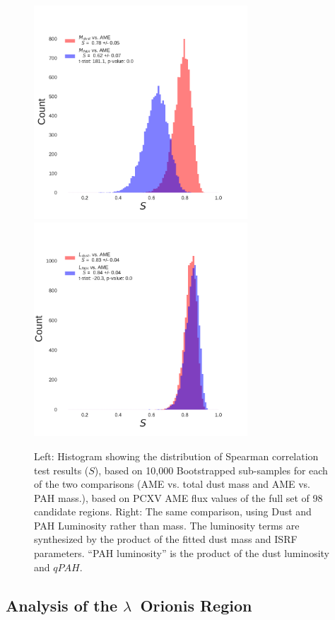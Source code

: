 \documentclass[preprint2,longabstract]{aastex}
\begin{document}
\begin{figure}
  \label{fig:AME_boostrap_regs_all}

  \includegraphics[width=80mm]{../Plots/RegsAME_Bootstrap_MDustandMPAH.pdf}
  \includegraphics[width=80mm]{../Plots/RegsAME_Bootstrap_LDustandLPAH.pdf}

  \centering
  \caption{Left: Histogram showing the distribution of Spearman correlation test results ($S$), based on 10,000 Bootstrapped sub-samples for each of the two comparisons (AME vs. total dust mass and AME vs. PAH mass.), based on PCXV AME flux values of the full set of 98 candidate regions. Right: The same comparison, using Dust and PAH Luminosity rather than mass. The luminosity terms are synthesized by the product of the fitted dust mass and ISRF parameters. ``PAH luminosity'' is the product of the dust luminosity and $qPAH$.}

\end{figure}

\subsection{Analysis of the $\lambda$~Orionis Region}
\end{document}

